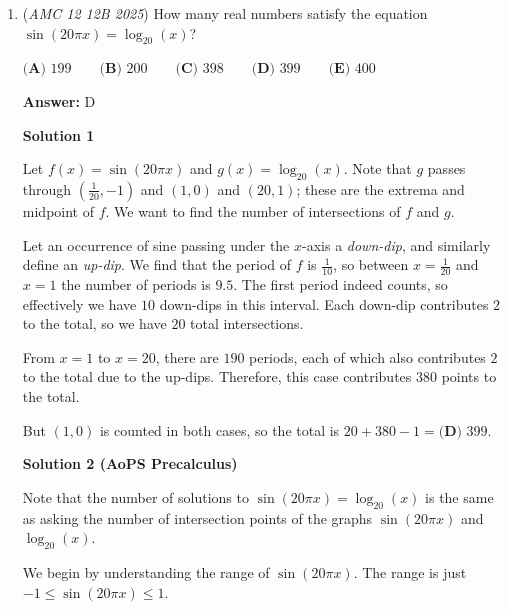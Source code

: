 \begin{enumerate}
 
For $p=0$, $2025x=0$ $($mod $z)$, $2025y=0$ $($mod $z)$. The statement is always false because both remainders are always $0$.

 


 In the end, we identify and add all the possible values of $z$ together.

 
$2025=kz+1$ for some positive integer $k$
$kz=2024$
$kz=2^3\times{11}\times{23}$

 
In the end, do not forget that $z=1$ is not included. The answer is $4320-1=4319$. 

 


	\item (\textit{AMC 12 12B 2025}) How many real numbers satisfy the equation $\sin(20\pi x) = \log_{20}(x)$?


 $\textbf{(A) } 199 \qquad \textbf{(B) } 200 \qquad \textbf{(C) } 398 \qquad \textbf{(D) } 399 \qquad \textbf{(E) } 400$

 \textbf{Answer: }D



\textbf{Solution 1}

Let $f(x)=\sin(20\pi x)$ and $g(x)=\log_{20}(x)$. Note that $g$ passes through $\left(\frac{1}{20},-1\right)$ and $(1,0)$ and $(20,1)$; these are the extrema and midpoint of $f$. We want to find the number of intersections of $f$ and $g$.

 Let an occurrence of sine passing under the $x$-axis a \textit{down-dip}, and similarly define an \textit{up-dip}. We find that the period of $f$ is $\frac{1}{10}$, so between $x=\frac{1}{20}$ and $x=1$ the number of periods is $9.5$. The first period indeed counts, so effectively we have $10$ down-dips in this interval. Each down-dip contributes $2$ to the total, so we have $20$ total intersections.

 From $x=1$ to $x=20$, there are $190$ periods, each of which also contributes $2$ to the total due to the up-dips. Therefore, this case contributes $380$ points to the total.

 But $(1,0)$ is counted in both cases, so the total is $20+380-1=\boxed{\textbf{(D) } 399}$.

 



\textbf{Solution 2 (AoPS Precalculus)}

Note that the number of solutions to $\sin(20\pi x) = \log_{20}(x)$ is the same as asking the number of intersection points of the graphs $\sin(20\pi x)$ and $\log_{20}(x)$.

 We begin by understanding the range of $\sin(20\pi x)$. The range is just $-1 \le \sin(20\pi x) \le 1$.


\end{enumerate}
